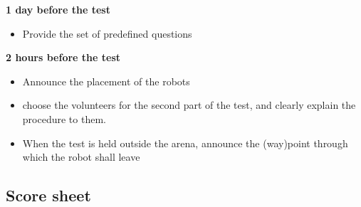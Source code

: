 \textbf{1 day before the test}
\begin{itemize}
    \item Provide the set of predefined questions
\end{itemize}

\textbf{2 hours before the test}
\begin{itemize}
    \item Announce the placement of the robots
    \item choose the volunteers for the second part of the test, and clearly explain the procedure to them.
    \item When the test is held outside the arena, announce the (way)point through which the robot shall leave
\end{itemize}

\newpage
\subsection{Score sheet}


